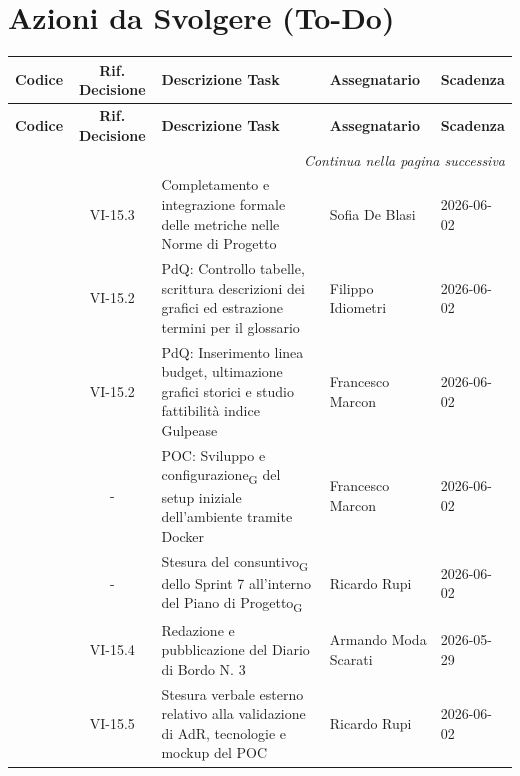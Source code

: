 \section{Azioni da Svolgere (To-Do)}

\renewcommand{\arraystretch}{1.3}
\begin{longtable}{c c p{4.5cm} p{3cm} l}
	\toprule
	\textbf{Codice} & \textbf{Rif. Decisione} & \textbf{Descrizione Task} & \textbf{Assegnatario} & \textbf{Scadenza} \\
	\midrule
	\endfirsthead

	\toprule
	\textbf{Codice} & \textbf{Rif. Decisione} & \textbf{Descrizione Task} & \textbf{Assegnatario} & \textbf{Scadenza} \\
	\midrule
	\endhead

	\midrule
	\multicolumn{5}{r}{\textit{Continua nella pagina successiva}} \\
	\midrule
	\endfoot

	\bottomrule
	\endlastfoot

	\ghissue{185} & VI-15.3 & Completamento e integrazione formale delle metriche nelle Norme di Progetto & Sofia De Blasi & 2026-06-02 \\[4pt]
	
	\ghissue{186} & VI-15.2 & PdQ: Controllo tabelle, scrittura descrizioni dei grafici ed estrazione termini per il glossario & Filippo Idiometri & 2026-06-02 \\[4pt]
	
	\ghissue{187} & VI-15.2 & PdQ: Inserimento linea budget, ultimazione grafici storici e studio fattibilità indice Gulpease & Francesco Marcon & 2026-06-02 \\[4pt]
	
	\ghissue{193} & - & POC: Sviluppo e configurazione\textsubscript{G} del setup iniziale dell'ambiente tramite Docker & Francesco Marcon & 2026-06-02 \\[4pt]
	
	\ghissue{188} & - & Stesura del consuntivo\textsubscript{G} dello Sprint 7 all'interno del Piano di Progetto\textsubscript{G} & Ricardo Rupi & 2026-06-02 \\[4pt]
	
	\ghissue{189} & VI-15.4 & Redazione e pubblicazione del Diario di Bordo N. 3 & Armando Moda Scarati & 2026-05-29 \\[4pt]
	
	\ghissue{190} & VI-15.5 & Stesura verbale esterno relativo alla validazione di AdR, tecnologie e mockup del POC & Ricardo Rupi & 2026-06-02 \\[4pt]
	

\end{longtable}
